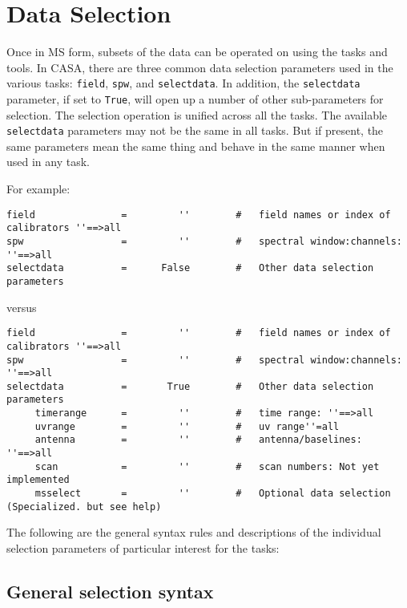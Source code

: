 \section{Data Selection}
\label{section:io.selection}

Once in MS form, subsets of the data can be operated on using the tasks and
tools.  In CASA, there are three common data selection parameters used in
the various
tasks: {\tt field}, {\tt spw}, and {\tt selectdata}.  In addition, the
{\tt selectdata} parameter, if set to {\tt True}, will open up a
number of other sub-parameters 
for selection.  The selection operation is unified across all the tasks.  The
available {\tt selectdata} parameters may not be the same in all tasks.  But if
present, the same parameters mean the same thing and behave in the
same manner when used in any task.

For example:
\small
\begin{verbatim}
field               =         ''        #   field names or index of calibrators ''==>all
spw                 =         ''        #   spectral window:channels: ''==>all
selectdata          =      False        #   Other data selection parameters
\end{verbatim}
\normalsize
versus
\small
\begin{verbatim}
field               =         ''        #   field names or index of calibrators ''==>all
spw                 =         ''        #   spectral window:channels: ''==>all
selectdata          =       True        #   Other data selection parameters
     timerange      =         ''        #   time range: ''==>all 
     uvrange        =         ''        #   uv range''=all
     antenna        =         ''        #   antenna/baselines: ''==>all
     scan           =         ''        #   scan numbers: Not yet implemented
     msselect       =         ''        #   Optional data selection (Specialized. but see help)

\end{verbatim}
\normalsize

The following are the general syntax rules and descriptions of the
individual selection parameters of particular interest for the tasks:

\subsection{General selection syntax}
\label{section:io.selection.syntax}

